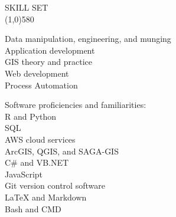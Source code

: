 \documentclass{article}
\begin{document}
\noindent \large{SKILL SET}\\ 
\line(1,0){580}\\
\parbox[t][3cm][t]{0.4\textwidth}{
	\textbullet Data manipulation, engineering, and munging\\
	\textbullet Application development\\
	\textbullet GIS theory and practice\\
	\textbullet Web development\\
	\textbullet Process Automation\\
} 
\parbox[t][2.5cm][t]{0.07\textwidth}{\hfil}
\parbox[t][3.2cm][t]{0.45\textwidth}{
	Software proficiencies and familiarities:\\
	\small{
		\textbullet R and Python\\
		\textbullet SQL\\
		\textbullet AWS cloud services\\
		\textbullet ArcGIS, QGIS, and SAGA-GIS\\
		\textbullet C\# and VB.NET\\
		\textbullet JavaScript\\
		\textbullet Git version control software\\
		\textbullet \LaTeX{} and Markdown\\
		\textbullet Bash and CMD\\
	}
}
\end{document}
